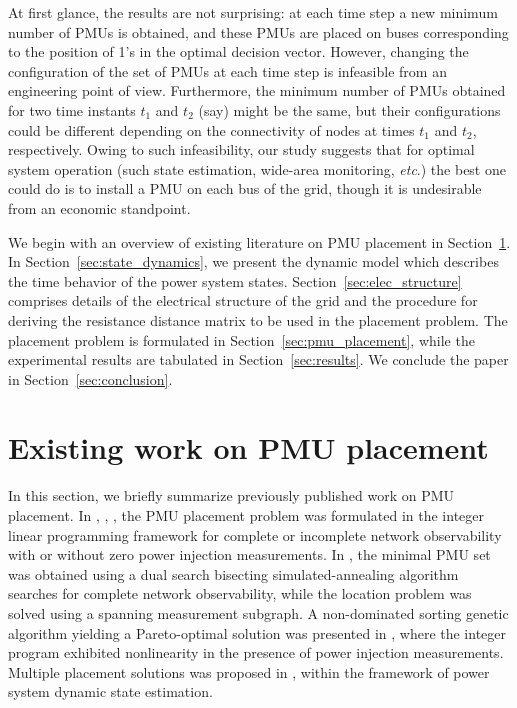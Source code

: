 \documentclass[10pt,journal,twocolumn]{IEEEtran}\IEEEoverridecommandlockouts
\newcommand{\etc}{{\em etc}}
\newcommand{\secref}[1]{Section~\ref{#1}}
\begin{document}
At first glance, the results are not surprising: at each time step a new minimum number of PMUs is obtained, and these PMUs are placed on buses corresponding to the position of 1's in the optimal decision vector. However, changing the configuration of the set of PMUs at each time step is infeasible from an engineering point of view. Furthermore, the minimum number of PMUs obtained for two time instants $t_1$ and $t_2$ (say) might be the same, but their configurations could be different depending on the connectivity of nodes at times $t_1$ and $t_2$, respectively. Owing to such infeasibility, our study suggests that for optimal system operation (such state estimation, wide-area monitoring, {\etc}.) the best one could do is to install a PMU on each bus of the grid, though it is undesirable from an economic standpoint.

We begin with an overview of existing literature on PMU placement in \secref{sec:relatedwork}. In \secref{sec:state_dynamics}, we present the dynamic model which describes the time behavior of the power system states. \secref{sec:elec_structure} comprises details of the electrical structure of the grid and the procedure for deriving the resistance distance matrix to be used in the placement problem. The placement problem is formulated in \secref{sec:pmu_placement}, while the experimental results are tabulated in \secref{sec:results}. We conclude the paper in \secref{sec:conclusion}.

\section{Existing work on PMU placement}\label{sec:relatedwork}
In this section, we briefly summarize previously published work on PMU placement. In \cite{Nuqui2005}, \cite{Gou2008}, \cite{Gou2008a}, the PMU placement problem was formulated in the integer linear  programming framework for complete or incomplete network observability with or without zero power injection measurements. In \cite{Baldwin1993}, the minimal PMU set was obtained using a dual search bisecting simulated-annealing algorithm searches for complete network observability, while the location problem was solved using a spanning measurement subgraph. A non-dominated sorting genetic algorithm yielding a Pareto-optimal solution was presented in \cite{Milosevic2003}, where the integer program exhibited nonlinearity in the presence of power injection measurements. Multiple placement solutions was proposed in \cite{Zhang2010}, within the framework of power system dynamic state estimation.
\end{document}
